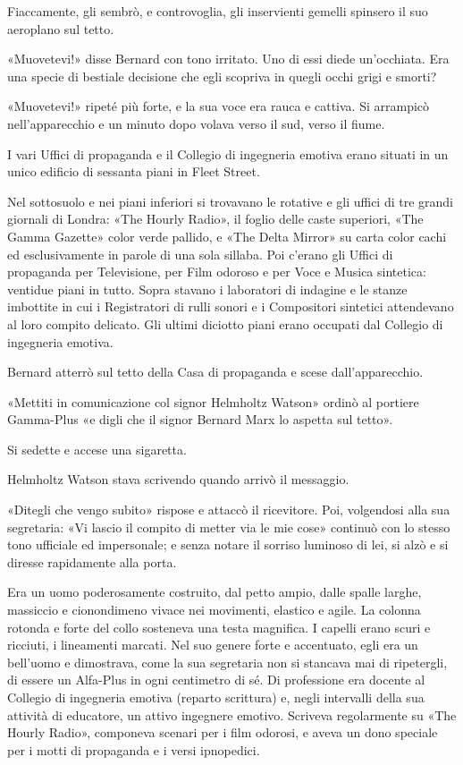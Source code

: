 \documentclass[
a5paper, %
10pt, %
twoside, 
onecolumn, %
openany, %
]{memoir}
\begin{document}
Fiaccamente, gli sembrò, e controvoglia, gli inservienti gemelli spinsero il suo aeroplano sul tetto.

«Muovetevi!» disse Bernard con tono irritato. Uno di essi diede un’occhiata. Era una specie di bestiale decisione che egli scopriva in quegli occhi grigi e smorti?

«Muovetevi!» ripeté più forte, e la sua voce era rauca e cattiva. Si arrampicò nell’apparecchio e un minuto dopo volava verso il sud, verso il fiume.

I vari Uffici di propaganda e il Collegio di ingegneria emotiva erano situati in un unico edificio di sessanta piani in Fleet Street.

Nel sottosuolo e nei piani inferiori si trovavano le rotative e gli uffici di tre grandi giornali di Londra: «The Hourly Radio», il foglio delle caste superiori, «The Gamma Gazette» color verde pallido, e «The Delta Mirror» su carta color cachi ed esclusivamente in parole di una sola sillaba. Poi c’erano gli Uffici di propaganda per Televisione, per Film odoroso e per Voce e Musica sintetica: ventidue piani in tutto. Sopra stavano i laboratori di indagine e le stanze imbottite in cui i Registratori di rulli sonori e i Compositori sintetici attendevano al loro compito delicato. Gli ultimi diciotto piani erano occupati dal Collegio di ingegneria emotiva.

Bernard atterrò sul tetto della Casa di propaganda e scese dall’apparecchio.

«Mettiti in comunicazione col signor Helmholtz Watson» ordinò al portiere Gamma-Plus «e digli che il signor Bernard Marx lo aspetta sul tetto».

Si sedette e accese una sigaretta.

Helmholtz Watson stava scrivendo quando arrivò il messaggio.

«Ditegli che vengo subito» rispose e attaccò il ricevitore. Poi, volgendosi alla sua segretaria: «Vi lascio il compito di metter via le mie cose» continuò con lo stesso tono ufficiale ed impersonale; e senza notare il sorriso luminoso di lei, si alzò e si diresse rapidamente alla porta.

Era un uomo poderosamente costruito, dal petto ampio, dalle spalle larghe, massiccio e cionondimeno vivace nei movimenti, elastico e agile. La colonna rotonda e forte del collo sosteneva una testa magnifica. I capelli erano scuri e ricciuti, i lineamenti marcati. Nel suo genere forte e accentuato, egli era un bell’uomo e dimostrava, come la sua segretaria non si stancava mai di ripetergli, di essere un Alfa-Plus in ogni centimetro di sé. Di professione era docente al Collegio di ingegneria emotiva (reparto scrittura) e, negli intervalli della sua attività di educatore, un attivo ingegnere emotivo. Scriveva regolarmente su «The Hourly Radio», componeva scenari per i film odorosi, e aveva un dono speciale per i motti di propaganda e i versi ipnopedici.
\end{document}
